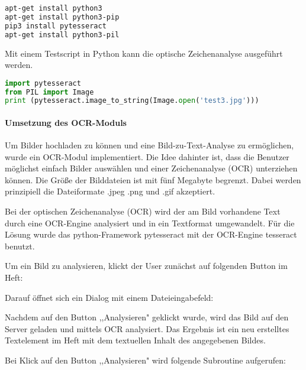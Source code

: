 \begin{lstlisting}[caption={pytesseract-Installation}, language=bash]
apt-get install python3
apt-get install python3-pip
pip3 install pytesseract
apt-get install python3-pil
\end{lstlisting}

Mit einem Testscript in Python kann die optische Zeichenanalyse ausgeführt werden.

\begin{lstlisting}[caption={pytesseract-Code}, language=Python]
import pytesseract
from PIL import Image
print (pytesseract.image_to_string(Image.open('test3.jpg')))
\end{lstlisting}

\paragraph{Umsetzung des OCR-Moduls}
Um Bilder hochladen zu können und eine Bild-zu-Text-Analyse zu ermöglichen, wurde ein OCR-Modul implementiert. Die Idee dahinter ist, dass die Benutzer möglichst einfach Bilder auswählen und einer Zeichenanalyse (OCR) unterziehen können. Die Größe der Bilddateien ist mit fünf Megabyte begrenzt. Dabei werden prinzipiell die Dateiformate .jpeg .png und .gif akzeptiert.

Bei der optischen Zeichenanalyse (OCR) wird der am Bild vorhandene Text durch eine OCR-Engine analysiert und in ein Textformat umgewandelt. Für die Lösung wurde das python-Framework pytesseract mit der OCR-Engine tesseract benutzt.

Um ein Bild zu analysieren, klickt der User zunächst auf folgenden Button im Heft:


Darauf öffnet sich ein Dialog mit einem Dateieingabefeld:


Nachdem auf den Button ,,Analysieren" geklickt wurde, wird das Bild auf den Server geladen und mittels OCR analysiert. Das Ergebnis ist ein neu erstelltes Textelement im Heft mit dem textuellen Inhalt des angegebenen Bildes.

\newpage

Bei Klick auf den Button ,,Analysieren" wird folgende Subroutine aufgerufen:


